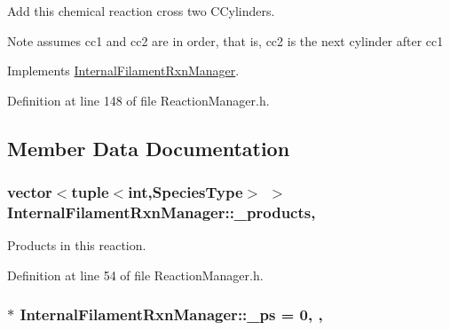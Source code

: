 Add this chemical reaction cross two C\+Cylinders. 

\begin{DoxyNote}{Note}
assumes cc1 and cc2 are in order, that is, cc2 is the next cylinder after cc1 
\end{DoxyNote}


Implements \hyperlink{classInternalFilamentRxnManager_ac8152bcd9f6aa5d69f85a98cff86d2b0}{Internal\+Filament\+Rxn\+Manager}.



Definition at line 148 of file Reaction\+Manager.\+h.



\subsection{Member Data Documentation}
\hypertarget{classInternalFilamentRxnManager_afd213da1a3706e2e88962e5da886a5dc}{
\subsubsection[{\+\_\+products}]{\setlength{\rightskip}{0pt plus 5cm}vector$<$tuple$<$int,{\bf Species\+Type}$>$ $>$ Internal\+Filament\+Rxn\+Manager\+::\+\_\+products\hspace{0.3cm}{\ttfamily [protected]}, {\ttfamily [inherited]}}}\label{classInternalFilamentRxnManager_afd213da1a3706e2e88962e5da886a5dc}


Products in this reaction. 



Definition at line 54 of file Reaction\+Manager.\+h.

\hypertarget{classInternalFilamentRxnManager_a973ce9cc2aae811e6867afa46193c5f2}{
\subsubsection[{\+\_\+ps}]{ $\ast$ Internal\+Filament\+Rxn\+Manager\+::\+\_\+ps = 0\hspace{0.3cm}{\ttfamily [static]}, {\ttfamily [protected]}, {\ttfamily [inherited]}}}\label{classInternalFilamentRxnManager_a973ce9cc2aae811e6867afa46193c5f2}


